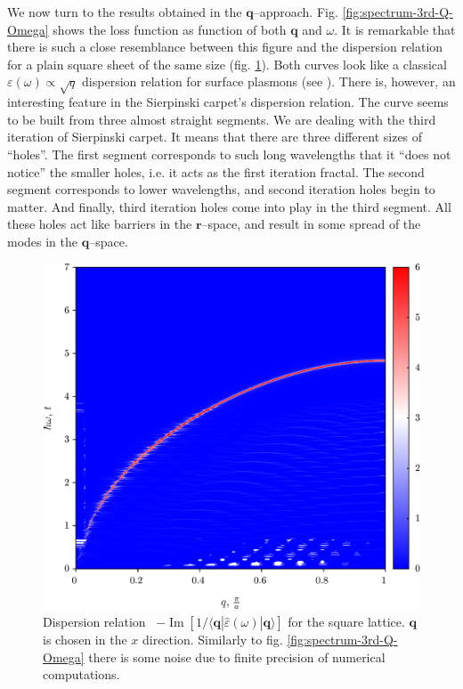 \documentclass[a4paper,12pt]{article}
\begin{document}
    We now turn to the results obtained in the $\mathbf{q}$--approach. Fig. \ref{fig:spectrum-3rd-Q-Omega} shows the loss function as function of both $\mathbf{q}$ and $\omega$. It is remarkable that there is such a close resemblance between this figure and the dispersion relation for a plain square sheet of the same size (fig. \ref{fig:spectrum-SL-Q-Omega}). Both curves look like a classical $\varepsilon(\omega) \propto \sqrt{q}$ dispersion relation for surface plasmons (see \cite{giuliani2005quantum}). There is, however, an interesting feature in the Sierpinski carpet's dispersion relation. The curve seems to be built from three almost straight segments. We are dealing with the third iteration of Sierpinski carpet. It means that there are three different sizes of ``holes''. The first segment corresponds to such long wavelengths that it ``does not notice'' the smaller holes, i.e. it acts as the first iteration fractal. The second segment corresponds to lower wavelengths, and second iteration holes begin to matter. And finally, third iteration holes come into play in the third segment. All these holes act like barriers in the $\mathbf{r}$--space, and result in some spread of the modes in the $\mathbf{q}$--space.

    \begin{figure}[h]
    \center
    \includegraphics[width=\textwidth]{Spectrum-SL-Q-Omega.png}
    \caption{Dispersion relation \ $-\operatorname{Im}[1 / \langle\mathbf{q}| \hat\varepsilon(\omega) |\mathbf{q}\rangle]$ for the square lattice. $\mathbf{q}$ is chosen in the $x$ direction. Similarly to fig. \ref{fig:spectrum-3rd-Q-Omega} there is some noise due to finite precision of numerical computations.}
    \label{fig:spectrum-SL-Q-Omega}
    \end{figure}
\end{document}
